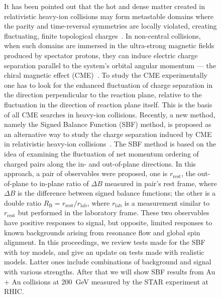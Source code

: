 \begin{figure}[htbp]
It has been pointed out that the hot and dense matter created in relativistic heavy-ion collisions may form metastable domains where the parity and
time-reversal symmetries are locally violated, creating fluctuating, finite topological charges~\cite{ref1}. In non-central collisions, when such domains are immersed  in the ultra-strong magnetic fields produced by spectator protons,  they can induce electric charge separation parallel to the system's orbital angular momentum --- the chiral magnetic effect (CME)~\cite{ref2}. 
To study the CME experimentally one has to look for the enhanced fluctuation of charge separation in the direction perpendicular to the reaction plane, relative to the fluctuation in the direction of reaction plane itself. This is the basis of all CME searches in heavy-ion collisions.
Recently,  a new method,  namely the Signed Balance Function (SBF) method, is proposed as an alternative way to study the charge separation induced by CME in relativistic heavy-ion collisions~\cite{tang2019probe}.
The SBF method is based on the idea of examining the fluctuation of net momentum ordering of charged pairs along the in- and out-of-plane directions.  In this approach, a pair of observables were proposed,  one is $r_{\mathrm{rest}}$, the out-of-plane to in-plane ratio of $\Delta B$ measured in pair's rest frame, where $\Delta B$ is the difference between signed balance functions; the other is a double ratio $R_{\mathrm{B}} = r_{\mathrm{rest}}/r_{\mathrm{lab}}$,  where $r_{\mathrm{lab}}$ is a measurement similar to $r_{\mathrm{rest}}$ but performed in the laboratory frame.
These two observables have positive responses to signal, but opposite, limited responses to known backgrounds arising from resonance flow and global spin alignment. In this proceedings, we review tests made for the SBF with toy models, and give an update on tests made with realistic models. Latter ones include combinations of background and signal with various strengths. After that we will show SBF results from Au + Au collisions at 200~GeV measured by the STAR experiment at RHIC. 

\vspace{-0.38cm}

\label{results}

\vspace{-0.08cm}


\end{figure}
